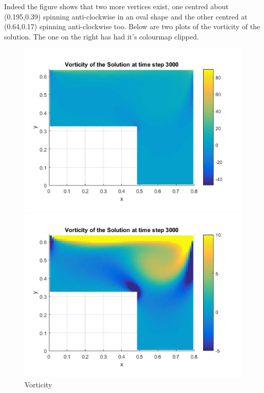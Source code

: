 \documentclass[11pt,a4paper,notitlepage]{article}
\begin{document}
Indeed the figure shows that two more vertices exist, one centred about (0.195,0.39) spinning anti-clockwise in an oval shape and the other centred at (0.64,0.17) spinning anti-clockwise too. Below are two plots of the vorticity of the solution. The one on the right has had it's colourmap clipped.


\begin{figure}[h] 
\begin{minipage}{0.5\textwidth}
\includegraphics[width=1.1\linewidth]{CavityVort1.jpg}
\end{minipage}
\begin{minipage}{0.5\textwidth}
\includegraphics[width=1.1\linewidth]{CavityVort2.jpg}
\end{minipage}
\caption{Vorticity}
\label{cav.vort}
\end{figure}
\end{document}
